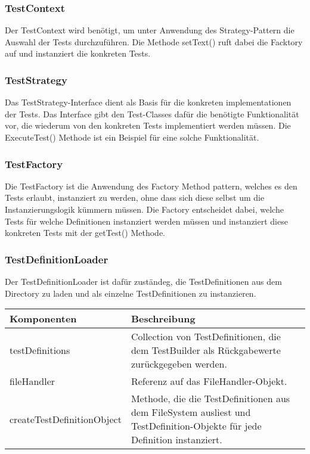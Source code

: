 \documentclass[
	ngerman,
	toc=listof, %
	toc=bibliography, %
	footnotes=multiple, %
	parskip=half, %
	numbers=noendperiod %
]{scrartcl}
\begin{document}
	\subsubsection{TestContext}
	Der TestContext wird benötigt, um unter Anwendung des Strategy-Pattern die Auswahl der Tests durchzuführen.
	Die Methode setText() ruft dabei die Facktory auf und instanziert die konkreten Tests.

	\subsubsection{TestStrategy}
	Das TestStrategy-Interface dient als Basis für die konkreten implementationen der Tests. 
	Das Interface gibt den Test-Classes dafür die benötigte Funktionalität vor, die wiederum von den konkreten Tests implementiert werden müssen.
	Die ExecuteTest() Methode ist ein Beispiel für eine solche Funktionalität.

	\subsubsection{TestFactory}
	Die TestFactory ist die Anwendung des Factory Method pattern, welches es den Tests erlaubt, instanziert zu werden, ohne dass sich diese selbst um die Instanzierungslogik kümmern müssen.
	Die Factory entscheidet dabei, welche Tests für welche Definitionen instanziert werden müssen und instanziert diese konkreten Tests mit der getTest() Methode.

	\subsubsection{TestDefinitionLoader}
	Der TestDefinitionLoader ist dafür zuständeg, die TestDefinitionen aus dem Directory zu laden und als einzelne TestDefinitionen zu instanzieren.
	
	\begin{tabularx}{\textwidth}{lX}
		\toprule
			Komponenten & Beschreibung \\
		\midrule
			testDefinitions & Collection von TestDefinitionen, die dem TestBuilder als Rückgabewerte zurückgegeben werden. \\
			fileHandler & Referenz auf das FileHandler-Objekt. \\
		\midrule
			createTestDefinitionObject & Methode, die die TestDefinitionen aus dem FileSystem ausliest und TestDefinition-Objekte für jede Definition instanziert. \\
		\bottomrule
	\end{tabularx}
\end{document}
